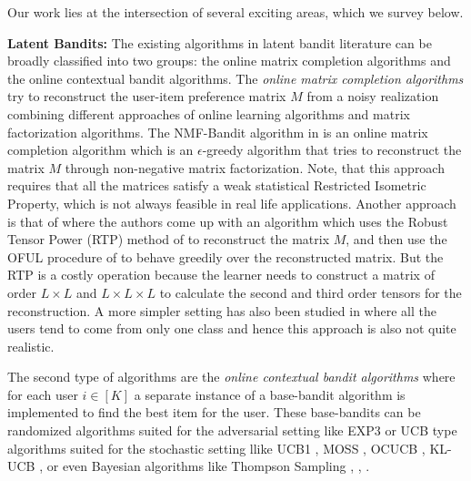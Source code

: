Our work lies at the intersection of several exciting areas, which we survey below.

\textbf{Latent Bandits:} The existing algorithms in latent bandit literature can be broadly classified into two groups: the online matrix completion algorithms and the online contextual bandit  algorithms. The \textit{online matrix completion algorithms} try to reconstruct the user-item preference matrix $M$ from a noisy realization combining different approaches of online learning algorithms and matrix factorization algorithms. The NMF-Bandit algorithm in \citet{sen2016contextual} is an online matrix completion algorithm which is an $\epsilon$-greedy algorithm that tries to reconstruct the matrix $M$ through non-negative matrix factorization. Note, that this approach requires that all the matrices satisfy a weak statistical Restricted Isometric Property, which is not always feasible in real life applications. Another approach is that of \citet{gopalan2016low} where the authors come up with an algorithm which uses the Robust Tensor Power (RTP) method of \citet{anandkumar2014tensor} to reconstruct the matrix $M$, and then use the OFUL procedure of \citet{abbasi2011improved} to behave greedily over the reconstructed matrix. But the RTP is a costly operation because the learner needs to construct a matrix of order $L\times L$ and $L\times L \times L$ to calculate the second and third order tensors for the reconstruction.  A more simpler setting has also been studied in \citet{maillard2014latent} where all the users tend to come from only one class and hence this approach is also not quite realistic. 

	The second type of algorithms are the \textit{online contextual bandit algorithms} where for each user $i\in[K]$ a separate instance of a base-bandit algorithm is implemented to find the best item for the user. These base-bandits can be randomized algorithms suited for the adversarial setting like EXP3 \citep{auer2002nonstochastic} or UCB type algorithms suited for the stochastic setting llike UCB1 \citep{auer2002finite}, MOSS \citep{audibert2009minimax}, OCUCB \citep{lattimore2015optimally}, KL-UCB \citep{cappe2013kullback}, \citep{garivier2011kl} or even Bayesian algorithms like Thompson Sampling \citep{thompson1933likelihood}, \citep{thompson1935theory}, \citep{agrawal2012analysis}.



